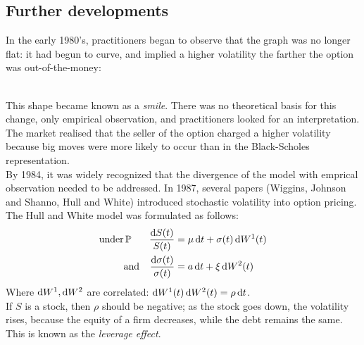 \documentclass[11pt]{article}
\begin{document}
\subsection{Further developments}
In the early 1980's, practitioners began to observe that the graph was no longer flat: it had begun to curve, and implied a higher volatility the farther the option was out-of-the-money: \\

 \\

This shape became known as a {\em smile}. There was no theoretical basis for this change, only empirical observation, and practitioners looked for an interpretation. The market realised that the seller of the option charged a higher volatility because big moves were more likely to occur than in the Black-Scholes representation. \\

By 1984, it was widely recognized that the divergence of the model with emprical observation needed to be addressed. In 1987, several papers (Wiggins, Johnson and Shanno, Hull and White) introduced stochastic volatility into option pricing. The Hull and White model was formulated as follows:
\begin{align*}
\text{under} & \Pmeas & \frac{\dif S(t)}{S(t)} &= \mu \dif t + \sigma(t) \dif W^1(t) \\
& \text{and} & \frac{\dif \sigma(t)}{\sigma(t)} &= a \dif t + \xi \dif W^2(t)
\end{align*}
Where $\dif W^1, \dif W^2$ are correlated: $\dif W^1(t) \dif W^2(t) = \rho \dif t$. \\

If $S$ is a stock, then $\rho$ should be negative; as the stock goes down, the volatility rises, because the equity of a firm decreases, while the debt remains the same. This is known as the {\em leverage effect}.
\end{document}
